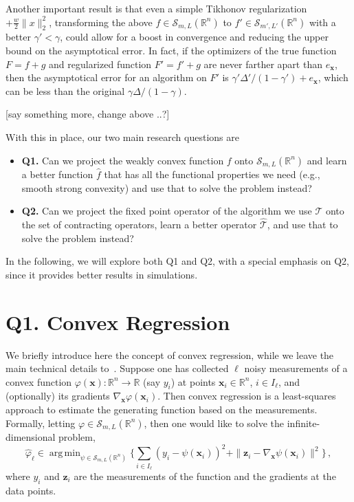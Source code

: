 \documentclass{article}
\DeclareMathOperator*{\argmin}{arg\,min}
\newcommand{\R}{\mathbb{R}}
\newcommand{\x}{\mathbold{x}}
\newcommand{\z}{\mathbold{z}}
\newcommand{\andrea}[1]{{\color{red}[#1]}}
\begin{document}
Another important result is that even a simple Tikhonov regularization $+ \frac{w}{2} \|x\|^2_2$, transforming the above $f \in \mathcal{S}_{m,L}(\R^n)$ to $f' \in \mathcal{S}_{m',L'}(\R^n)$ with a better $\gamma'<\gamma$, could allow for a boost in convergence and reducing the upper bound on the asymptotical error. In fact, if the optimizers of the true function $F = f+g$ and regularized function $F' = f'+g$ are never farther apart than $e_{\x}$, then the asymptotical error for an algorithm on $F'$ is $\gamma'\Delta'/(1-\gamma') + e_{\x}$, which can be less than the original $\gamma\Delta/(1-\gamma)$.   

\andrea{say something more, change above ..?}

With this in place, our two main research questions are
\begin{itemize}
\item {\bf Q1.} Can we project the weakly convex function $f$ onto $\mathcal{S}_{m,L}(\R^n)$ and learn a better function $\hat{f}$ that has all the functional properties we need (e.g., smooth strong convexity) and use that to solve the problem instead?

\item {\bf Q2.} Can we project the fixed point operator of the algorithm we use $\mathcal{T}$ onto the set of contracting operators, learn a better operator $\hat{\mathcal{T}}$, and use that to solve the problem instead?

\end{itemize}

In the following, we will explore both Q1 and Q2, with a special emphasis on Q2, since it provides better results in simulations. 

\section{Q1. Convex Regression}

We briefly introduce here the concept of convex regression, while we leave the main technical details to~\cite{Mazumder2019,simonetto_smooth_2021}. Suppose one has collected $\ell$ noisy measurements of a convex function $\varphi(\x): \R^n \to \R$ (say $y_i$) at points $\x_i \in \R^n$, $i \in I_{\ell}$, and (optionally) its gradients $\nabla_{\x} \varphi(\x_i)$. Then convex regression is a least-squares approach to estimate the generating function based on the measurements. Formally, letting $\varphi \in \mathcal{S}_{m,L}(\R^n)$, then one would like to solve the infinite-dimensional problem, 
\begin{equation}\label{eq.inf}
\hat{\varphi}_{\ell} \in \argmin_{\psi \in \mathcal{S}_{m, L}(\R^n)}\Big\{ \sum_{i\in I_{\ell}} (y_i - \psi(\x_i))^2 + \|\z_i - \nabla_{\x} \psi(\x_i)\|^2 \Big\} \,,
\end{equation}
where $y_i$ and $\z_i$ are the measurements of the function and the gradients at the data points. 
\end{document}
